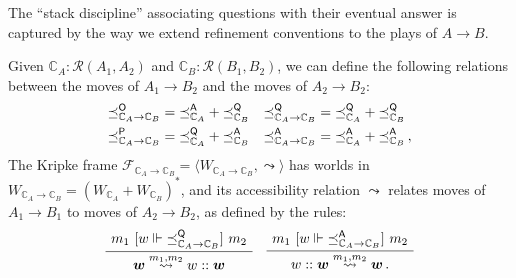 The ``stack discipline'' associating questions
with their eventual answer is captured by
the way we extend refinement conventions to
the plays of $A \rightarrow B$.

\begin{definition} %
Given
$\mathbb{C}_A : \mathcal{R}(A_1, A_2)$ and
$\mathbb{C}_B : \mathcal{R}(B_1, B_2)$,
we can define the following relations
between the moves of $A_1 \rightarrow B_2$
and the moves of $A_2 \rightarrow B_2$:
\begin{align*}
  {\preceq}_{\mathbb{C}_A \rightarrow \mathbb{C}_B}^{ \mathsf{O} } &=
    {\preceq}_{\mathbb{C}_A}^{ \mathsf{A} } +
    {\preceq}_{\mathbb{C}_B}^{ \mathsf{Q} } &
  {\preceq}_{\mathbb{C}_A \rightarrow \mathbb{C}_B}^{ \mathsf{Q} } &=
    {\preceq}_{\mathbb{C}_A}^{ \mathsf{Q} } +
    {\preceq}_{\mathbb{C}_B}^{ \mathsf{Q} } \\
  {\preceq}_{\mathbb{C}_A \rightarrow \mathbb{C}_B}^{ \mathsf{P} } &=
    {\preceq}_{\mathbb{C}_A}^{ \mathsf{Q} } +
    {\preceq}_{\mathbb{C}_B}^{ \mathsf{A} } &
  {\preceq}_{\mathbb{C}_A \rightarrow \mathbb{C}_B}^{ \mathsf{A} } &=
    {\preceq}_{\mathbb{C}_A}^{ \mathsf{A} } +
    {\preceq}_{\mathbb{C}_B}^{ \mathsf{A} } \,,
\end{align*}
The Kripke frame
$\mathcal{F}_{\mathbb{C}_A \rightarrow \mathbb{C}_B} =
 \langle W_{\mathbb{C}_A \rightarrow \mathbb{C}_B}, \leadsto \rangle$
has worlds in
$W_{\mathbb{C}_A \rightarrow \mathbb{C}_B} =
 (W_{\mathbb{C}_A} + W_{\mathbb{C}_B})^*$,
and its accessibility relation $\leadsto$
relates moves of $A_1 \rightarrow B_1$
to moves of $A_2 \rightarrow B_2$,
as defined by the rules:
\[
    \AxiomC{$m_1 \ifr{w \Vdash {\preceq}_{\mathbb{C}_A \rightarrow \mathbb{C}_B}^\kw{Q}} m_2$}
    \UnaryInfC{$\vec{w} \stackrel{m_1, m_2}{\leadsto} w :: \vec{w}$}
    \DisplayProof
    \quad
    \AxiomC{$m_1 \ifr{w \Vdash {\preceq}^\kw{A}_{\mathbb{C}_A \rightarrow \mathbb{C}_B}} m_2$}
    \UnaryInfC{$w :: \vec{w} \stackrel{m_1, m_2}{\leadsto} \vec{w} \,.$}
    \DisplayProof
\]
\end{definition}

